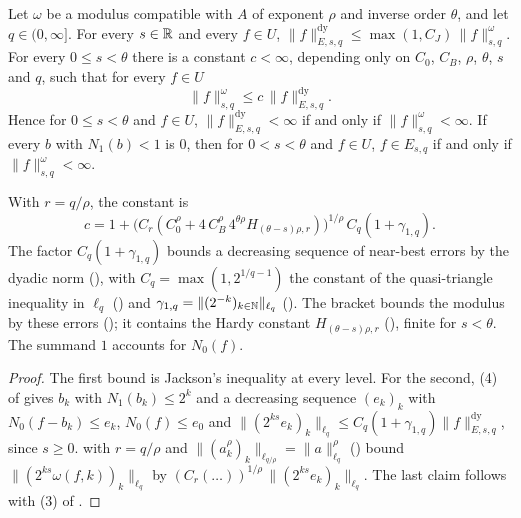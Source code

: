 \begin{theorem}
\label{thm:couple-modulus-coincidence}
\leanok
{}
Let $\omega$ be a modulus compatible with $A$ of exponent $\rho$ and inverse order $\theta$, and
let $q \in (0, \infty]$. For every $s \in \mathbb{R}$ and every $f \in U$,
$\|f\|^{\mathrm{dy}}_{E, s, q} \leq \max(1, C_J) \, \|f\|^{\omega}_{s,q}$. For every
$0 \leq s < \theta$ there is a constant $c < \infty$, depending only on $C_0$, $C_B$, $\rho$,
$\theta$, $s$ and $q$, such that for every $f \in U$
\[
  \|f\|^{\omega}_{s,q} \leq c \, \|f\|^{\mathrm{dy}}_{E, s, q} .
\]
Hence for $0 \leq s < \theta$ and $f \in U$, $\|f\|^{\mathrm{dy}}_{E, s, q} < \infty$ if and
only if $\|f\|^{\omega}_{s,q} < \infty$. If every $b$ with $N_1(b) < 1$ is $0$, then for
$0 < s < \theta$ and $f \in U$, $f \in E_{s, q}$ if and only if $\|f\|^{\omega}_{s,q} < \infty$.
\end{theorem}

With $r = q/\rho$, the constant is
\[
  c = 1 + \bigl(C_r (C_0^\rho + 4 \, C_B^\rho \, 4^{\theta\rho} H_{(\theta - s)\rho, r})
  \bigr)^{1/\rho} \, C_q (1 + \gamma_{1, q}) .
\]
The factor $C_q (1 + \gamma_{1, q})$ bounds a decreasing sequence of near-best errors by the
dyadic norm (), with $C_q = \max(1, 2^{1/q - 1})$ the constant of the
quasi-triangle inequality in $\ell_q$ () and
$\gamma_{1, q} = \|(2^{-k})_{k \in \mathbb{N}}\|_{\ell_q}$ (). The bracket bounds
the modulus by these errors (); it contains the Hardy
constant $H_{(\theta - s)\rho, r}$ (), finite for $s < \theta$.
The summand $1$ accounts for $N_0(f)$.

\begin{proof}
\leanok
{}
The first bound is Jackson's inequality at every level. For the second, (4) of
 gives $b_k$ with $N_1(b_k) \leq 2^k$ and a decreasing sequence $(e_k)_k$
with $N_0(f - b_k) \leq e_k$, $N_0(f) \leq e_0$ and
$\|(2^{ks} e_k)_k\|_{\ell_q} \leq C_q (1 + \gamma_{1, q}) \|f\|^{\mathrm{dy}}_{E, s, q}$, since
$s \geq 0$.  with $r = q/\rho$ and
$\|(a_k^\rho)_k\|_{\ell_{q/\rho}} = \|a\|_{\ell_q}^\rho$ () bound
$\|(2^{ks} \omega(f, k))_k\|_{\ell_q}$ by $(C_r (\dots))^{1/\rho} \, \|(2^{ks} e_k)_k\|_{\ell_q}$.
The last claim follows with (3) of .
\end{proof}

